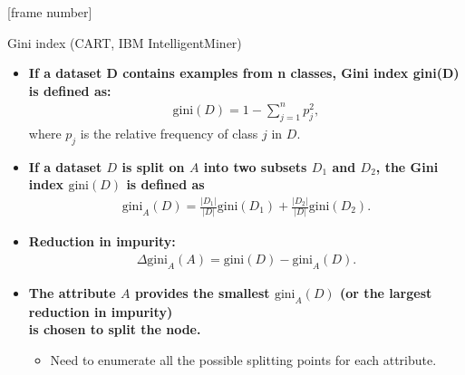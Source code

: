 \documentclass[aspectratio=169,t,table]{beamer}
\begin{document}
  {
    [frame number]
    \begin{frame}{Gini index (CART, IBM IntelligentMiner)}
      \begin{itemize}
        \item \textbf{If a dataset D contains examples from n classes, Gini index gini(D) is defined as:}
        \begin{align}
          \text{gini}(D) = 1-\sum_{j=1}^{n} p_j^2,
        \end{align}
        where $p_j$ is the relative frequency of class $j$ in $D$.
        \item \textbf{If a dataset $D$ is split on $A$ into two subsets $D_1$ and $D_2$, the Gini index $\text{gini}(D)$ is defined as}
        \begin{align}
          \text{gini}_A(D) = \frac{|D_1|}{|D|}\text{gini}(D_1)+\frac{|D_2|}{|D|}\text{gini}(D_2).
        \end{align}
        \item \textbf{Reduction in impurity:}
        \begin{align}
          \Delta \text{gini}_A(A) = \text{gini}(D)-\text{gini}_A(D).
        \end{align}
        \item \textbf{The attribute $A$ provides the smallest $\text{gini}_A(D)$ (or the largest reduction in impurity) \\ is chosen to split the node.}
        \begin{itemize}
          \item Need to enumerate all the possible splitting points for each attribute.
        \end{itemize}
      \end{itemize}
    \end{frame}
  }
\end{document}

